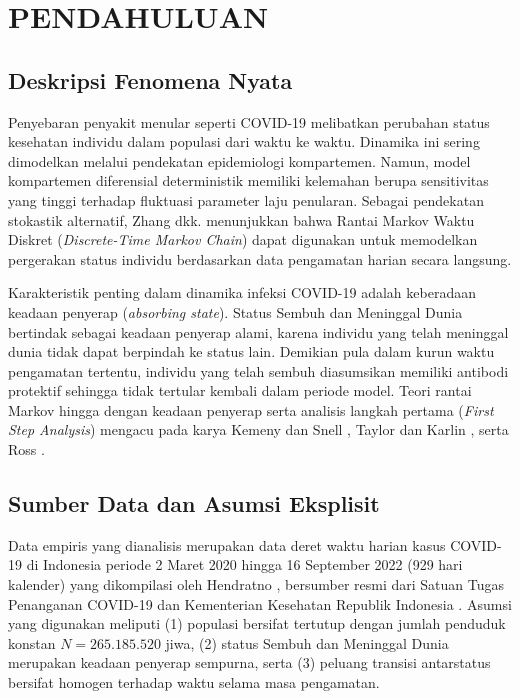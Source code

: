 \documentclass[12pt,a4paper]{article}
\numberwithin{equation}{section}
\begin{document}
\newpage
{}
\setcounter{page}{1}

\section{PENDAHULUAN}
\thispagestyle{plain}

\subsection{Deskripsi Fenomena Nyata}
Penyebaran penyakit menular seperti COVID-19 melibatkan perubahan status kesehatan individu dalam populasi dari waktu ke waktu. Dinamika ini sering dimodelkan melalui pendekatan epidemiologi kompartemen. Namun, model kompartemen diferensial deterministik memiliki kelemahan berupa sensitivitas yang tinggi terhadap fluktuasi parameter laju penularan. Sebagai pendekatan stokastik alternatif, Zhang dkk. \cite{zhang2020} menunjukkan bahwa Rantai Markov Waktu Diskret (\textit{Discrete-Time Markov Chain}) dapat digunakan untuk memodelkan pergerakan status individu berdasarkan data pengamatan harian secara langsung.

Karakteristik penting dalam dinamika infeksi COVID-19 adalah keberadaan keadaan penyerap (\textit{absorbing state}). Status Sembuh dan Meninggal Dunia bertindak sebagai keadaan penyerap alami, karena individu yang telah meninggal dunia tidak dapat berpindah ke status lain. Demikian pula dalam kurun waktu pengamatan tertentu, individu yang telah sembuh diasumsikan memiliki antibodi protektif sehingga tidak tertular kembali dalam periode model. Teori rantai Markov hingga dengan keadaan penyerap serta analisis langkah pertama (\textit{First Step Analysis}) mengacu pada karya Kemeny dan Snell \cite{kemeny1976}, Taylor dan Karlin \cite{taylor1998}, serta Ross \cite{ross2014}.

\subsection{Sumber Data dan Asumsi Eksplisit}
Data empiris yang dianalisis merupakan data deret waktu harian kasus COVID-19 di Indonesia periode 2 Maret 2020 hingga 16 September 2022 (929 hari kalender) yang dikompilasi oleh Hendratno \cite{hendratno2022}, bersumber resmi dari Satuan Tugas Penanganan COVID-19 \cite{satgascovid2022} dan Kementerian Kesehatan Republik Indonesia \cite{kemenkes2020}. Asumsi yang digunakan meliputi (1) populasi bersifat tertutup dengan jumlah penduduk konstan $N = 265.185.520$ jiwa, (2) status Sembuh dan Meninggal Dunia merupakan keadaan penyerap sempurna, serta (3) peluang transisi antarstatus bersifat homogen terhadap waktu selama masa pengamatan.
\end{document}
